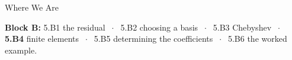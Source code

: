 

\graphicspath{{./figures/}}





\makedecktitle

\begin{frame}{Where We Are}
\vspace{-1mm}
\begin{center}
\small \textbf{Block B:} 5.B1 the residual $\;\cdot\;$ 5.B2 choosing a basis $\;\cdot\;$ 5.B3 Chebyshev $\;\cdot\;$ \textbf{5.B4} finite elements $\;\cdot\;$ 5.B5 determining the coefficients $\;\cdot\;$ 5.B6 the worked example.
\end{center}
\end{frame}

